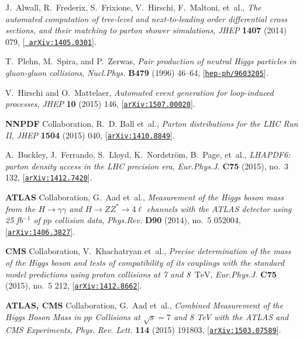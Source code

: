 \documentclass[a4paper,11pt]{article}
\begin{document}
\begin{thebibliography}{100}
J.~Alwall, R.~Frederix, S.~Frixione, V.~Hirschi, F.~Maltoni, et~al., {\it {The
  automated computation of tree-level and next-to-leading order differential
  cross sections, and their matching to parton shower simulations}},  {\em
  JHEP} {\bf 1407} (2014) 079, [\href{http://arxiv.org/abs/1405.0301}{{\tt
  arXiv:1405.0301}}].

T.~Plehn, M.~Spira, and P.~Zerwas, {\it {Pair production of neutral Higgs
  particles in gluon-gluon collisions}},  {\em Nucl.Phys.} {\bf B479} (1996)
  46--64, [\href{http://arxiv.org/abs/hep-ph/9603205}{{\tt hep-ph/9603205}}].

V.~Hirschi and O.~Mattelaer, {\it {Automated event generation for loop-induced
  processes}},  {\em JHEP} {\bf 10} (2015) 146,
  [\href{http://arxiv.org/abs/1507.00020}{{\tt arXiv:1507.00020}}].

{\bf NNPDF} Collaboration, R.~D. Ball et~al., {\it {Parton distributions for
  the LHC Run II}},  {\em JHEP} {\bf 1504} (2015) 040,
  [\href{http://arxiv.org/abs/1410.8849}{{\tt arXiv:1410.8849}}].

A.~Buckley, J.~Ferrando, S.~Lloyd, K.~Nordström, B.~Page, et~al., {\it
  {LHAPDF6: parton density access in the LHC precision era}},  {\em
  Eur.Phys.J.} {\bf C75} (2015), no.~3 132,
  [\href{http://arxiv.org/abs/1412.7420}{{\tt arXiv:1412.7420}}].

{\bf ATLAS} Collaboration, G.~Aad et~al., {\it {Measurement of the Higgs boson
  mass from the $H\rightarrow \gamma\gamma$ and $H \rightarrow ZZ^{*}
  \rightarrow 4\ell$ channels with the ATLAS detector using 25 fb$^{-1}$ of
  $pp$ collision data}},  {\em Phys.Rev.} {\bf D90} (2014), no.~5 052004,
  [\href{http://arxiv.org/abs/1406.3827}{{\tt arXiv:1406.3827}}].

{\bf CMS} Collaboration, V.~Khachatryan et~al., {\it {Precise determination of
  the mass of the Higgs boson and tests of compatibility of its couplings with
  the standard model predictions using proton collisions at 7 and 8 $\,\text
  {TeV}$}},  {\em Eur.Phys.J.} {\bf C75} (2015), no.~5 212,
  [\href{http://arxiv.org/abs/1412.8662}{{\tt arXiv:1412.8662}}].

{\bf ATLAS, CMS} Collaboration, G.~Aad et~al., {\it {Combined Measurement of
  the Higgs Boson Mass in $pp$ Collisions at $\sqrt{s}=7$ and 8 TeV with the
  ATLAS and CMS Experiments}},  {\em Phys. Rev. Lett.} {\bf 114} (2015) 191803,
  [\href{http://arxiv.org/abs/1503.07589}{{\tt arXiv:1503.07589}}].


\end{thebibliography}
\end{document}
